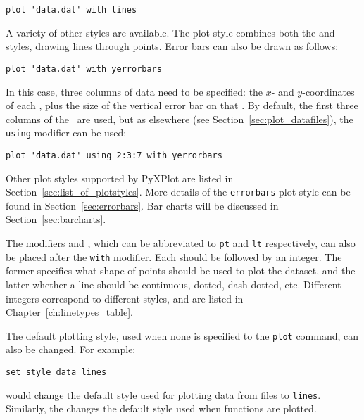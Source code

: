 \begin{verbatim}
plot 'data.dat' with lines
\end{verbatim}

A variety of other styles are available. The  plot style
combines both the  and  styles, drawing lines
through points. Error bars can also be drawn as follows:

\begin{verbatim}
plot 'data.dat' with yerrorbars
\end{verbatim}

\noindent In this case, three columns of data need to be specified: the $x$-
and $y$-coordinates of each \datapoint, plus the size of the vertical error bar
on that \datapoint. By default, the first three columns of the \datafile\ are
used, but as elsewhere (see Section~\ref{sec:plot_datafiles}), the {\tt using}
modifier can be used:

\begin{verbatim}
plot 'data.dat' using 2:3:7 with yerrorbars
\end{verbatim}

Other plot styles supported by PyXPlot are listed in
Section~\ref{sec:list_of_plotstyles}.  More details of the {\tt errorbars} plot
style can be found in Section~\ref{sec:errorbars}. Bar charts will be discussed
in Section~\ref{sec:barcharts}.

\label{sec:pointtype}
The modifiers  and , which can be
abbreviated to {\tt pt} and {\tt lt} respectively, can also be placed after the
{\tt with} modifier. Each should be followed by an integer.  The former
specifies what shape of points should be used to plot the dataset, and the
latter whether a line should be continuous, dotted, dash-dotted, etc.
Different integers correspond to different styles, and are listed in
Chapter~\ref{ch:linetypes_table}.

The default plotting style, used when none is specified to the {\tt plot}
command, can also be changed.  For example:

\begin{verbatim}
set style data lines
\end{verbatim}

\noindent would change the default style used for plotting data from files to
{\tt lines}. Similarly, the  changes the default
style used when functions are plotted.

